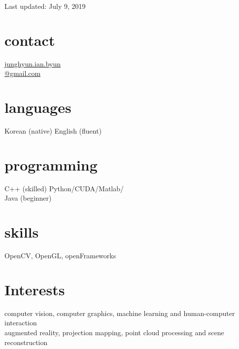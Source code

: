 \documentclass[]{friggeri-cv}
\begin{document}
       {Last updated: July 9, 2019}

\begin{aside}
  \section{contact}
    \href{mailto:junghyun.ian.byun@gmail.com}{junghyun.ian.byun\\@gmail.com}
  \section{languages}
    Korean (native)
    English (fluent)
  \section{programming}
    C++ (skilled)
    Python/CUDA/Matlab/\\Java (beginner)
  \section{skills}
    OpenCV, OpenGL, openFrameworks
\end{aside}


\section{Interests}

computer vision, computer graphics, machine learning and human-computer interaction\\
augmented reality, projection mapping, point cloud processing and scene reconstruction

\end{document}
